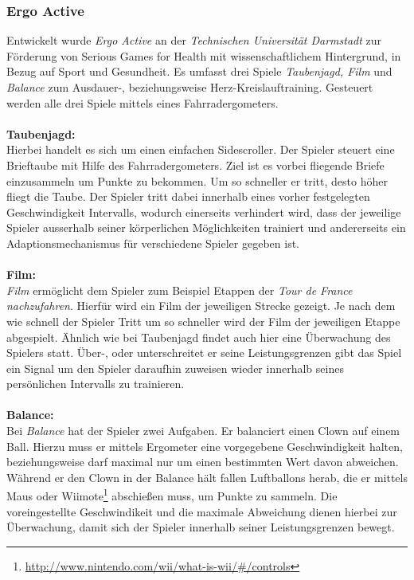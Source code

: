 		\subsubsection{Ergo Active}\label{ergoactive}
			Entwickelt wurde \textit{Ergo Active} an der \textit{Technischen Universität Darmstadt} \cite{Gobel:2010:SGH:1873951.1874316} zur Förderung von Serious Games for Health mit wissenschaftlichem Hintergrund, in Bezug auf Sport und Gesundheit. Es umfasst drei Spiele \textit{Taubenjagd, Film} und \textit{Balance} zum Ausdauer-, beziehungsweise Herz-Kreislauftraining. Gesteuert werden alle drei Spiele mittels eines Fahrradergometers.
			\\ \\
			\textbf{Taubenjagd:} \\
Hierbei handelt es sich um einen einfachen Sidescroller. Der Spieler steuert eine 	Brieftaube mit Hilfe des Fahrradergometers. Ziel ist es vorbei fliegende Briefe einzusammeln um Punkte zu bekommen. Um so schneller er tritt, desto höher fliegt die Taube. Der Spieler tritt dabei innerhalb eines vorher festgelegten Geschwindigkeit Intervalls, wodurch einerseits verhindert wird, dass der jeweilige Spieler ausserhalb seiner körperlichen Möglichkeiten trainiert und andererseits ein Adaptionsmechanismus für verschiedene Spieler gegeben ist. 
			\\ \\
			\textbf{Film:} \\
\textit{Film} ermöglicht dem Spieler zum Beispiel Etappen der \textit{Tour de France nachzufahren}. Hierfür wird ein Film der jeweiligen Strecke gezeigt. Je nach dem wie schnell der Spieler Tritt um so schneller wird der Film der jeweiligen Etappe abgespielt. Ähnlich wie bei Taubenjagd findet auch hier eine Überwachung des Spielers statt. Über-, oder unterschreitet er seine Leistungsgrenzen gibt das Spiel ein Signal um den Spieler daraufhin zuweisen wieder innerhalb seines persönlichen Intervalls zu trainieren.
			\\ \\
			\textbf{Balance:} \\
Bei \textit{Balance} hat der Spieler zwei Aufgaben. Er balanciert einen Clown auf einem Ball. Hierzu muss er mittels Ergometer eine vorgegebene Geschwindigkeit halten, beziehungsweise darf maximal nur um einen bestimmten Wert davon abweichen. Während er den Clown in der Balance hält fallen Luftballons herab, die er mittels Maus oder Wiimote\footnote{\url{http://www.nintendo.com/wii/what-is-wii/\#/controls}} abschießen muss, um Punkte zu sammeln. Die voreingestellte Geschwindikeit und die maximale Abweichung dienen hierbei zur Überwachung, damit  sich der Spieler innerhalb seiner Leistungsgrenzen bewegt. 
